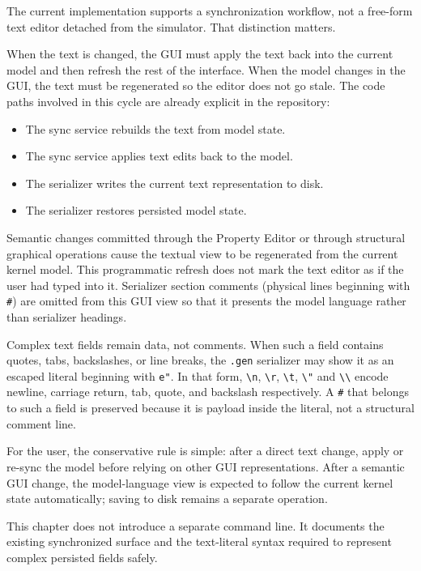 The current implementation supports a synchronization workflow, not a free-form
text editor detached from the simulator. That distinction matters.

When the text is changed, the GUI must apply the text back into the current
model and then refresh the rest of the interface. When the model changes in the
GUI, the text must be regenerated so the editor does not go stale. The code
paths involved in this cycle are already explicit in the repository:
\begin{itemize}
\item The sync service rebuilds the text from model state.
\item The sync service applies text edits back to the model.
\item The serializer writes the current text representation to disk.
\item The serializer restores persisted model state.
\end{itemize}

Semantic changes committed through the Property Editor or through structural
graphical operations cause the textual view to be regenerated from the current
kernel model. This programmatic refresh does not mark the text editor as if the
user had typed into it. Serializer section comments (physical lines beginning
with \texttt{\#}) are omitted from this GUI view so that it presents the model
language rather than serializer headings.

Complex text fields remain data, not comments. When such a field contains
quotes, tabs, backslashes, or line breaks, the \texttt{.gen} serializer may
show it as an escaped literal beginning with \texttt{e"}. In that form,
\texttt{\textbackslash{}n}, \texttt{\textbackslash{}r},
\texttt{\textbackslash{}t}, \texttt{\textbackslash{}"} and
\texttt{\textbackslash{}\textbackslash{}} encode newline, carriage return,
tab, quote, and backslash respectively. A \texttt{\#} that belongs to such a
field is preserved because it is payload inside the literal, not a structural
comment line.

For the user, the conservative rule is simple: after a direct text change,
apply or re-sync the model before relying on other GUI representations. After a
semantic GUI change, the model-language view is expected to follow the current
kernel state automatically; saving to disk remains a separate operation.

This chapter does not introduce a separate command line. It documents the
existing synchronized surface and the text-literal syntax required to represent
complex persisted fields safely.

